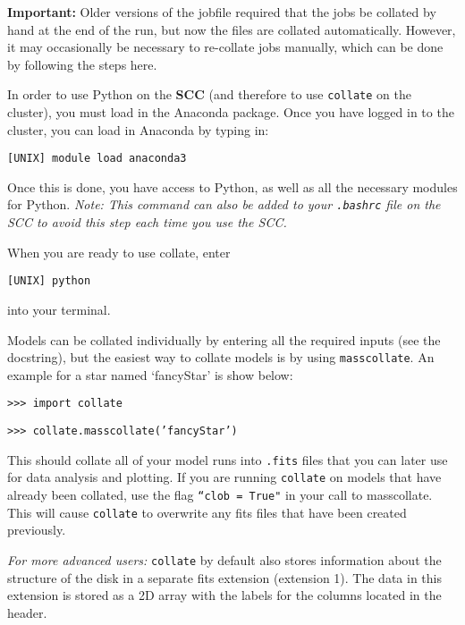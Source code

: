 \documentclass{article}
\begin{document}
\vspace{2mm}
\noindent \textbf{Important:} Older versions of the jobfile required that the jobs be collated by hand at the end of the run, but now the files are collated automatically. However, it may occasionally be necessary to re-collate jobs manually, which can be done by following the steps here.
\vspace{2mm}

\noindent In order to use Python on the \textbf{SCC} (and therefore to use \texttt{collate} on the cluster), you must load in the Anaconda package. Once you have logged in to the cluster, you can load in Anaconda by typing in: 

\vspace{2mm}
\texttt{[UNIX] module load anaconda3}
\vspace{2mm}

\noindent Once this is done, you have access to Python, as well as all the necessary modules for Python. \textit{Note: This command can also be added to your \texttt{.bashrc} file on the SCC to avoid this step each time you use the SCC.}

\vspace{2mm}
\noindent When you are ready to use collate, enter 

\vspace{2mm}
\texttt{[UNIX] python} 
\vspace{2mm}

\noindent into your terminal.
\vspace{2mm}

\noindent Models can be collated individually by entering all the required inputs (see the docstring), but the easiest way to collate models is by using \texttt{masscollate}. An example for a star named `fancyStar' is show below:

\vspace{2mm}
\texttt{>>> import collate}

\texttt{>>> collate.masscollate('fancyStar')}
\vspace{2mm}

\noindent This should collate all of your model runs into \texttt{.fits} files that you can later use for data analysis and plotting. If you are running \texttt{collate} on models that have already been collated, use the flag \texttt{``clob = True"} in your call to masscollate. This will cause \texttt{collate} to overwrite any fits files that have been created previously.

\noindent \textit{For more advanced users:} \texttt{collate} by default also stores information about the structure of the disk in a separate fits extension (extension 1). The data in this extension is stored as a 2D array with the labels for the columns located in the header. 
\end{document}
